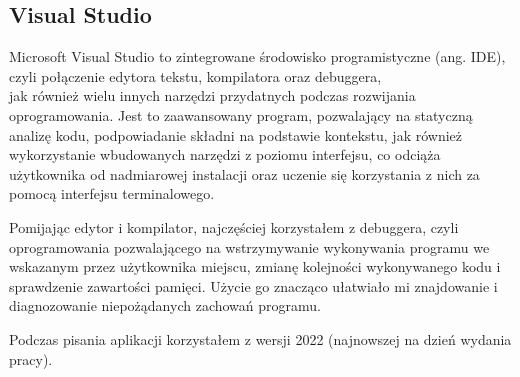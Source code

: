 \subsection{Visual Studio}

Microsoft Visual Studio \cite{visualStudio} to zintegrowane środowisko programistyczne (ang. IDE), 
czyli połączenie edytora tekstu, kompilatora oraz debuggera, \\
jak również wielu innych narzędzi przydatnych podczas rozwijania oprogramowania. 
Jest to zaawansowany program, pozwalający na statyczną analizę kodu, podpowiadanie składni na podstawie kontekstu,
jak również wykorzystanie wbudowanych narzędzi z poziomu interfejsu, co odciąża użytkownika od nadmiarowej instalacji
oraz uczenie się korzystania z nich za pomocą interfejsu terminalowego.

Pomijając edytor i kompilator, najczęściej korzystałem z debuggera, czyli oprogramowania pozwalającego na wstrzymywanie wykonywania programu
we wskazanym przez użytkownika miejscu, zmianę kolejności wykonywanego kodu i sprawdzenie zawartości pamięci.
Użycie go znacząco ułatwiało mi znajdowanie i diagnozowanie niepożądanych zachowań programu.

Podczas pisania aplikacji korzystałem z wersji 2022 (najnowszej na dzień wydania pracy).